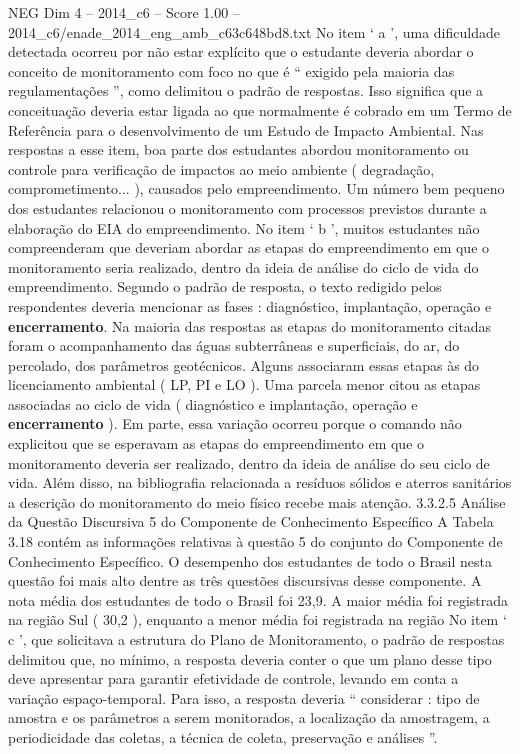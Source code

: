 \begin{textsample}{NEG Dim 4 – 2014\_c6 – Score 1.00 – 2014\_c6/enade\_2014\_eng\_amb\_c63c648bd8.txt}
No item ‘ a ’, uma dificuldade detectada ocorreu por não estar explícito que o estudante deveria abordar o conceito de monitoramento com foco no que é “ exigido pela maioria das regulamentações ”, como delimitou o padrão de respostas.
Isso significa que a conceituação deveria estar ligada ao que normalmente é cobrado em um Termo de Referência para o desenvolvimento de um Estudo de Impacto Ambiental.
Nas respostas a esse item, boa parte dos estudantes abordou monitoramento ou controle para verificação de impactos ao meio ambiente ( degradação, comprometimento... ), causados pelo empreendimento.
Um número bem pequeno dos estudantes relacionou o monitoramento com processos previstos durante a elaboração do EIA do empreendimento.
No item ‘ b ’, muitos estudantes não compreenderam que deveriam abordar as etapas do empreendimento em que o monitoramento seria realizado, dentro da ideia de análise do ciclo de vida do empreendimento.
Segundo o padrão de resposta, o texto redigido pelos respondentes deveria mencionar as fases : diagnóstico, implantação, operação e \textbf{encerramento}.
Na maioria das respostas as etapas do monitoramento citadas foram o acompanhamento das águas subterrâneas e superficiais, do ar, do percolado, dos parâmetros geotécnicos.
Alguns associaram essas etapas às do licenciamento ambiental ( LP, PI e LO ).
Uma parcela menor citou as etapas associadas ao ciclo de vida ( diagnóstico e implantação, operação e \textbf{encerramento} ).
Em parte, essa variação ocorreu porque o comando não explicitou que se esperavam as etapas do empreendimento em que o monitoramento deveria ser realizado, dentro da ideia de análise do seu ciclo de vida.
Além disso, na bibliografia relacionada a resíduos sólidos e aterros sanitários a descrição do monitoramento do meio físico recebe mais atenção. 3.3.2.5 Análise da Questão Discursiva 5 do Componente de Conhecimento Específico A Tabela 3.18 contém as informações relativas à questão 5 do conjunto do Componente de Conhecimento Específico.
O desempenho dos estudantes de todo o Brasil nesta questão foi mais alto dentre as três questões discursivas desse componente.
A nota média dos estudantes de todo o Brasil foi 23,9.
A maior média foi registrada na região Sul ( 30,2 ), enquanto a menor média foi registrada na região No item ‘ c ’, que solicitava a estrutura do Plano de Monitoramento, o padrão de respostas delimitou que, no mínimo, a resposta deveria conter o que um plano desse tipo deve apresentar para garantir efetividade de controle, levando em conta a variação espaço-temporal.
Para isso, a resposta deveria “ considerar : tipo de amostra e os parâmetros a serem monitorados, a localização da amostragem, a periodicidade das coletas, a técnica de coleta, preservação e análises ”.

\end{textsample}
